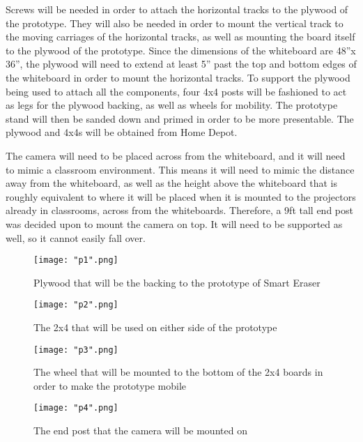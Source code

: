 \setlength{\parindent}{2.5ex}Screws will be needed in order to attach the horizontal tracks to the plywood of the prototype. They will also be needed in order to mount the vertical track to the moving carriages of the horizontal tracks, as well as mounting the board itself to the plywood of the prototype. Since the dimensions of the whiteboard are 48''x 36'', the plywood will need to extend at least 5'' past the top and bottom edges of the whiteboard in order to mount the horizontal tracks.  To support the plywood being used to attach all the components, four 4x4 posts will be fashioned to act as legs for the plywood backing, as well as wheels for mobility. The prototype stand will then be sanded down and primed in order to be more presentable. The plywood and 4x4s will be obtained from Home Depot.\par

\setlength{\parindent}{2.5ex}The camera will need to be placed across from the whiteboard, and it will need to mimic a classroom environment. This means it will need to mimic the distance away from the whiteboard, as well as the height above the whiteboard that is roughly equivalent to where it will be placed when it is mounted to the projectors already in classrooms, across from the whiteboards. Therefore, a 9ft tall end post was decided upon to mount the camera on top. It will need to be supported as well, so it cannot easily fall over.

\begin{figure}[H]
	\centering
	{\texttt{[image: "p1".png]}}
	\caption{  Plywood that will be the backing to the prototype of Smart Eraser
		\cite{hd2}}
	\label{fig:p1}
\end{figure}

\begin{figure}[H]
	\centering
	{\texttt{[image: "p2".png]}}
	\caption{  The 2x4 that will be used on either side of the prototype
		\cite{hd3}}
	\label{fig:p2}
\end{figure}

\begin{figure}[H]
	\centering
	{\texttt{[image: "p3".png]}}
	\caption{  The wheel that will be mounted to the bottom of the 2x4 boards in order to make the prototype mobile
		\cite{hd4}}
	\label{fig:p3}
\end{figure}

\begin{figure}[H]
	\centering
	{\texttt{[image: "p4".png]}}
	\caption{ The end post that the camera will be mounted on
		\cite{hd5}}
	\label{fig:p4}
\end{figure}

